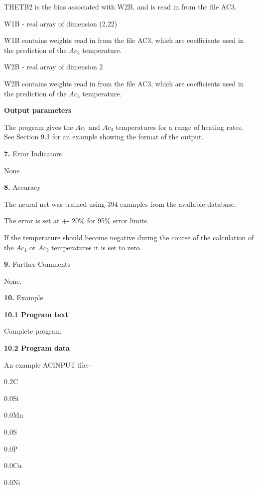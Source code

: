 \item {} \indent THETB2 is the bias associated with W2B, and is read in from 
the file AC3.
\medskip
\item {} W1B - real array of dimension (2,22)
\item {} \indent W1B contains weights read in from the file AC3, which are
coefficients used in the \indent  prediction of the $Ac_3$ temperature.
\medskip
\item {} W2B - real array of dimension 2
\item {} \indent W2B contains weights read in from the file AC3, which are
coefficients used in the \indent prediction of the $Ac_3$ temperature.
\dvd
\item {} {\bf Output parameters}
\bigskip
\item {} The program gives the $Ac_1$ and $Ac_3$ temperatures for a
range of heating rates. See Section 9.3 for an example showing the format
of the output.
\item{\bf 7.} {\largeb  Error Indicators}
\bigskip
\item {} None
\item{\bf 8.} {\largeb  Accuracy}
\bigskip
\item {} The neural net was trained using 394 examples from the available
database.
\medskip
\item {} The error is set at +- 20\% for 95\% error limits.
\medskip
\item {} If the temperature should become negative during the course of the
calculation of the $Ac_1$ or $Ac_3$ temperatures it is set to zero.
\item{\bf 9.} {\largeb  Further Comments}
\medskip
\item {} None.
\item{\bf 10.} {\largeb  Example}
\bigskip
\item{} {\bf 10.1 Program text}
\bigskip
\item {} Complete program.
\item {} {\bf 10.2 Program data}
\bigskip
\item {} An example ACINPUT file:-
\bigskip
\item {0.2}\indent	 C
\item {0.0}\indent 	 Si
\item {0.0}\indent	 Mn
\item {0.0}\indent 	 S
\item {0.0}\indent	 P
\item {0.0}\indent	 Cu
\item {0.0}\indent	Ni
